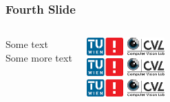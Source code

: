 \documentclass[xetex]{beamer}
\begin{document}

\begin{frame}
\frametitle{Fourth Slide}

\begin{columns}

Some text\\
Some more text


\begin{center}
\includegraphics[width=3cm]{tuwcvl.png}\\
\vspace{1cm}
\includegraphics[width=3cm]{tuwcvl.png}\\
\vspace{1cm}
\includegraphics[width=3cm]{tuwcvl.png}
\end{center}

\end{columns}

\end{frame}
\end{document}
